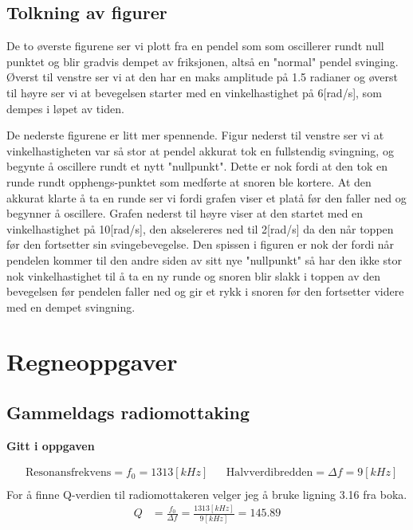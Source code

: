 \documentclass[a4paper,12pt,norsk]{article}
\begin{document}
\subsection{Tolkning av figurer}
De to øverste figurene ser vi plott fra en pendel som som oscillerer rundt null punktet og blir gradvis dempet av friksjonen, altså en "normal" pendel svinging. Øverst til venstre ser vi at den har en maks amplitude på 1.5 radianer og øverst til høyre ser vi at bevegelsen starter med en vinkelhastighet på 6[rad/s], som dempes i løpet av tiden. 

De nederste figurene er litt mer spennende. Figur nederst til venstre ser vi at vinkelhastigheten var så stor at pendel akkurat tok en fullstendig svingning, og begynte å oscillere rundt et nytt "nullpunkt". Dette er nok fordi at den tok en runde rundt opphengs-punktet som medførte at snoren ble kortere. At den akkurat klarte å ta en runde ser vi fordi grafen viser et platå før den faller ned og begynner å oscillere. Grafen nederst til høyre viser at den startet med en vinkelhastighet på 10[rad/s], den akselereres ned til 2[rad/s] da den når toppen før den fortsetter sin svingebevegelse. Den spissen i figuren er nok der fordi når pendelen kommer til den andre siden av sitt nye "nullpunkt" så har den ikke stor nok vinkelhastighet til å ta en ny runde og snoren blir slakk i toppen av den bevegelsen før pendelen faller ned og gir et rykk i snoren før den fortsetter videre med en dempet svingning.


\section{Regneoppgaver}
\subsection{Gammeldags radiomottaking}
\begin{center}
\textbf{Gitt i oppgaven}
\end{center}
\begin{align*}
&\text{Resonansfrekvens} = f_0 = 1313[kHz] && \text{Halvverdibredden} = \Delta f = 9[kHz] \\
\end{align*}
For å finne Q-verdien til radiomottakeren velger jeg å bruke ligning 3.16 fra boka.\cite{vistnes16}
\begin{align*}
Q &= \frac{f_0}{\Delta f} = \frac{1313[kHz]}{9[kHz]} = 145.89
\end{align*} 
\end{document}

